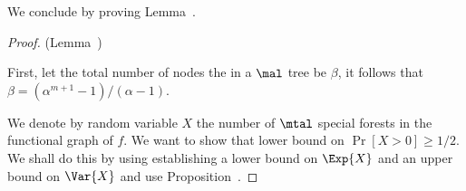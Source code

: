 We conclude by proving Lemma~.
\begin{proof}(Lemma~)

First, let the total number of nodes the in a $\mal$ tree be $\beta$, it follows that
$\beta=(\alpha^{m+1}-1)/(\alpha-1)$.


We denote by random variable $X$ the number of $\mtal$ special forests in the functional graph of $f$. 
We want to show that lower bound on $\Pr[X>0]\geq 1/2$. We shall do this by using establishing a lower bound on $\Exp{X}$ and an upper bound on $\Var{X}$ and use Proposition~.


















\end{proof}
